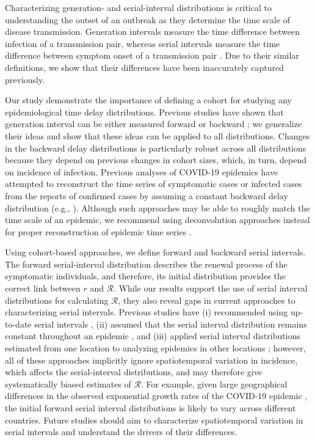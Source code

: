 \documentclass[12pt]{article}
\begin{document}
Characterizing generation- and serial-interval distributions is critical to understanding the outset of an outbreak as they determine the time scale of disease transmission.
Generation intervals measure the time difference between infection of a transmission pair, whereas serial intervals measure the time difference between symptom onset of a transmission pair \citep{svensson2007note}.
Due to their similar definitions, we show that their differences have been inaccurately captured previously.

Our study demonstrate the importance of defining a cohort for studying any epidemiological time delay distributions.
Previous studies have shown that generation interval can be either measured forward or backward \citep{champredon2015intrinsic};
we generalize their ideas and show that these ideas can be applied to all distributions.
Changes in the backward delay distributions is particularly robust across all distributions because they depend on previous changes in cohort sizes, which, in turn, depend on incidence of infection.
Previous analyses of COVID-19 epidemics have attempted to reconstruct the time series of symptomatic cases or infected cases from the reports of confirmed cases by assuming a constant backward delay distribution (e.g., \cite{tempvar, park2020potential, shim2020transmission}).
Although such approaches may be able to roughly match the time scale of an epidemic, we recommend using deconvolution approaches instead for proper reconstruction of epidemic time series \citep{goldstein2009reconstructing}.

Using cohort-based approaches, we define forward and backward serial intervals.
The forward serial-interval distribution describes the renewal process of the symptomatic individuals, and therefore, its initial distribution  provides the correct link between $r$ and $\mathcal R$.
While our results support the use of serial interval distributions for calculating $\mathcal R$, 
they also reveal gaps in current approaches to characterizing serial intervals.
Previous studies have (i) recommended using up-to-date serial intervals \citep{thompson2019improved}, (ii) assumed that the serial interval distribution remains constant throughout an epidemic \citep{wallinga2004different, cori2013new}, and (iii) applied serial interval distributions estimated from one location to analyzing epidemics in other locations \citep{tempvar};
however, all of these approaches implicitly ignore spatiotemporal variation in incidence, which affects the serial-interval distributions, and may therefore give systematically biased estimates of $\mathcal R$. 
For example, given large geographical differences in the observed exponential growth rates of the COVID-19 epidemic \citep{tempvar}, the initial forward serial interval distributions is likely to vary across different countries.
Future studies should aim to characterize spatiotemporal variation in serial intervals and understand the drivers of their differences.
\end{document}
